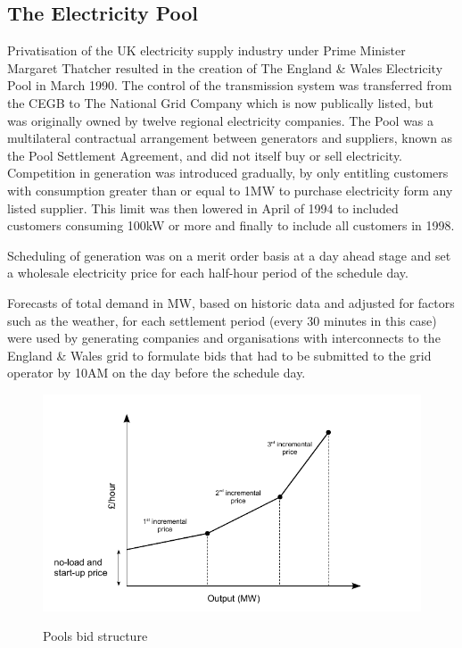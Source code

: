 \subsection{The Electricity Pool}
\label{sec:thepool}
Privatisation of the UK electricity supply industry under Prime Minister
Margaret Thatcher resulted in the creation of The England \& Wales Electricity
Pool in March 1990.  The control of the transmission system was transferred
from the CEGB to The National Grid Company which is now publically listed, but
was originally owned by twelve regional electricity companies.  The Pool was a
multilateral contractual arrangement between generators and suppliers, known as
the Pool Settlement Agreement, and did not itself buy or sell electricity.
Competition in generation was introduced gradually, by only entitling customers with
consumption greater than or equal to 1MW to purchase electricity form any
listed supplier.  This limit was then lowered in April of 1994 to included
customers consuming 100kW or more and finally to include all customers in 1998.

Scheduling of generation was on a merit order basis at a day ahead
stage and set a wholesale electricity price for each half-hour period of the
schedule day.

Forecasts of total demand in MW, based on historic data and adjusted for
factors such as the weather, for each settlement period (every 30 minutes in
this case) were used by generating companies and organisations with
interconnects to the England \& Wales grid to formulate bids that had to be
submitted to the grid operator by 10AM on the day before the schedule day.

\begin{figure}
	\centering
	\includegraphics[width=14cm]{figures/pool_bid_chart}
	\label{fig:poolbids}
	\caption{Pools bid structure}
\end{figure}

